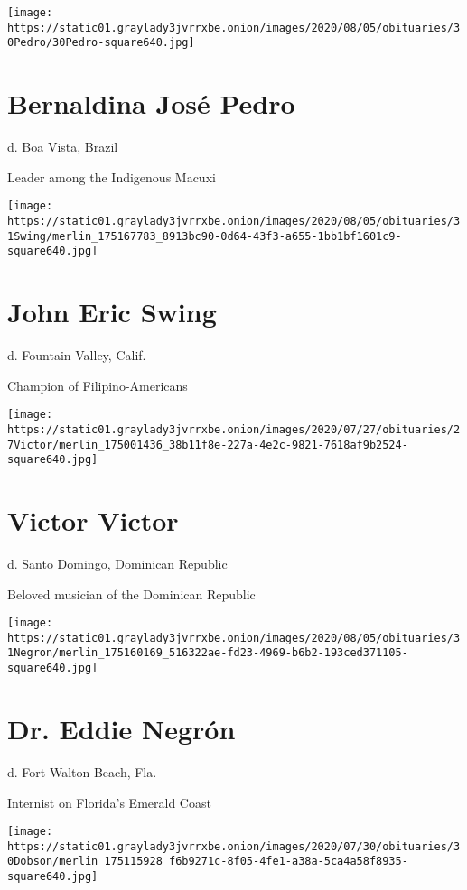 \texttt{[image: https://static01.graylady3jvrrxbe.onion/images/2020/08/05/obituaries/30Pedro/30Pedro-square640.jpg]}

\hypertarget{bernaldina-josuxe9-pedro}{%
\section{Bernaldina José Pedro}\label{bernaldina-josuxe9-pedro}}

d. Boa Vista, Brazil

Leader among the Indigenous Macuxi

\texttt{[image: https://static01.graylady3jvrrxbe.onion/images/2020/08/05/obituaries/31Swing/merlin\_175167783\_8913bc90-0d64-43f3-a655-1bb1bf1601c9-square640.jpg]}

\hypertarget{john-eric-swing}{%
\section{John Eric Swing}\label{john-eric-swing}}

d. Fountain Valley, Calif.

Champion of Filipino-Americans

\texttt{[image: https://static01.graylady3jvrrxbe.onion/images/2020/07/27/obituaries/27Victor/merlin\_175001436\_38b11f8e-227a-4e2c-9821-7618af9b2524-square640.jpg]}

\hypertarget{victor-victor}{%
\section{Victor Victor}\label{victor-victor}}

d. Santo Domingo, Dominican Republic

Beloved musician of the Dominican Republic

\texttt{[image: https://static01.graylady3jvrrxbe.onion/images/2020/08/05/obituaries/31Negron/merlin\_175160169\_516322ae-fd23-4969-b6b2-193ced371105-square640.jpg]}

\hypertarget{dr-eddie-negruxf3n}{%
\section{Dr. Eddie Negrón}\label{dr-eddie-negruxf3n}}

d. Fort Walton Beach, Fla.

Internist on Florida's Emerald Coast

\texttt{[image: https://static01.graylady3jvrrxbe.onion/images/2020/07/30/obituaries/30Dobson/merlin\_175115928\_f6b9271c-8f05-4fe1-a38a-5ca4a58f8935-square640.jpg]}

